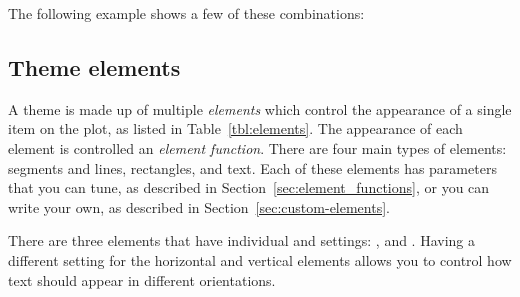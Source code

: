 \noindent The following example shows a few of these combinations:

% 
% 
% 
% 
% 


\subsection{Theme elements}
\label{sec:theme_elements}

A theme is made up of multiple \emph{elements} which control the appearance of a single item on the plot, as listed in Table~\ref{tbl:elements}.  The appearance of each element is controlled an \emph{element function}. There are four main types of elements: segments and lines, rectangles, and text.  Each of these elements has parameters that you can tune, as described in Section~\ref{sec:element_functions}, or you can write your own, as described in Section~\ref{sec:custom-elements}.

There are three elements that have individual  and  settings: ,  and .  Having a different setting for the horizontal and vertical elements allows you to control how text should appear in different orientations.

